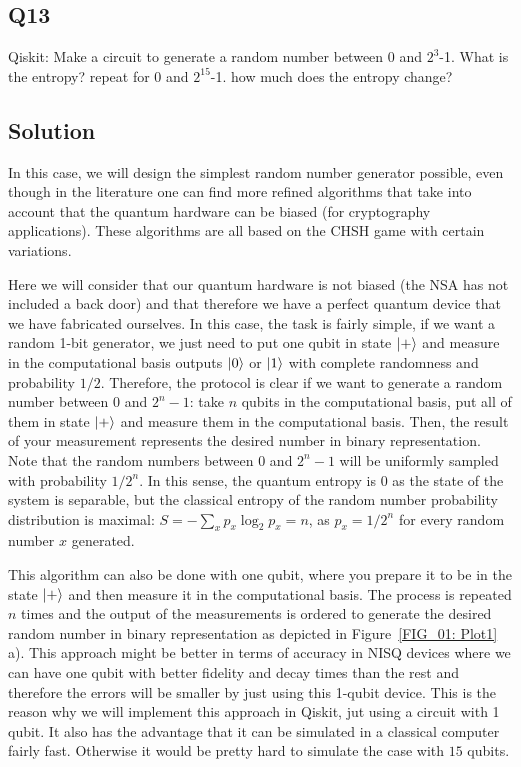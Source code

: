 \documentclass[12pt]{article}
\begin{document}
\begin{appendices}

\subsection*{Q13}
Qiskit: Make a circuit to generate a random number between 0 and $2^{3}$-1. What is the entropy? repeat for 0 and $2^{15}$-1. how much does the entropy change?

\subsection*{Solution}

In this case, we will design the simplest random number generator possible, even though in the literature one can find more refined algorithms that take into account that the quantum hardware can be biased (for cryptography applications). These algorithms are all based on the CHSH game with certain variations.

Here we will consider that our quantum hardware is not biased (the NSA has not included a back door) and that therefore we have a perfect quantum device that we have fabricated ourselves. In this case, the task is fairly simple, if we want a random 1-bit generator, we just need to put one qubit in state $\ket{+}$ and measure in the computational basis outputs $\ket{0}$ or $\ket{1}$ with complete randomness and probability $1/2$. Therefore, the protocol is clear if we want to generate a random number between $0$ and $2^n-1$: take $n$ qubits in the computational basis, put all of them in state $\ket{+}$ and measure them in the computational basis. Then, the result of your measurement represents the desired number in binary representation. Note that the random numbers between $0$ and $2^n-1$ will be uniformly sampled with probability $1/2^n$. In this sense, the quantum entropy is $0$ as the state of the system is separable, but the classical entropy of the random number probability distribution is maximal: $S = -\sum_xp_x \log_2 p_x = n$, as $p_x = 1/2^n$ for every random number $x$ generated.

This algorithm can also be done with one qubit, where you prepare it to be in the state $\ket{+}$ and then measure it in the computational basis. The process is repeated $n$ times and the output of the measurements is ordered to generate the desired random number in binary representation as depicted in Figure~\ref{FIG_01: Plot1} a). This approach might be better in terms of accuracy in NISQ devices where we can have one qubit with better fidelity and decay times than the rest and therefore the errors will be smaller by just using this 1-qubit device. This is the reason why we will implement this approach in Qiskit, jut using a circuit with 1 qubit. It also has the advantage that it can be simulated in a classical computer fairly fast. Otherwise it would be pretty hard to simulate the case with $15$ qubits.


\end{appendices}
\end{document}
